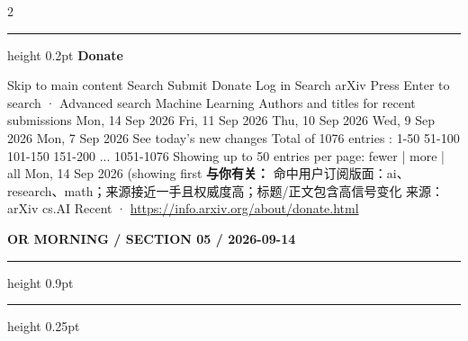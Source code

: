 \documentclass[10.5pt]{ctexart}
\begin{document}
\begin{multicols}{2}
\vspace{2mm}
\hrule height 0.2pt
\vspace{2mm}
{\large\bfseries Donate}\par
Skip to main content Search Submit Donate Log in Search arXiv Press Enter to search · Advanced search Machine Learning Authors and titles for recent submissions Mon, 14 Sep 2026 Fri, 11 Sep 2026 Thu, 10 Sep 2026 Wed, 9 Sep 2026 Mon, 7 Sep 2026 See today's new changes Total of 1076 entries : 1-50 51-100 101-150 151-200 ... 1051-1076 Showing up to 50 entries per page: fewer | more | all Mon, 14 Sep 2026 (showing first 
\textbf{与你有关：} 命中用户订阅版面：ai、research、math；来源接近一手且权威度高；标题/正文包含高信号变化
{\footnotesize\color{ormuted} 来源：arXiv cs.AI Recent · \url{https://info.arxiv.org/about/donate.html}}
\end{multicols}
\newpage
{\small\bfseries OR MORNING / SECTION 05 / 2026-09-14}
\vspace{2mm}
\hrule height 0.9pt
\vspace{1.5mm}
\hrule height 0.25pt
\vspace{4mm}
\end{document}
